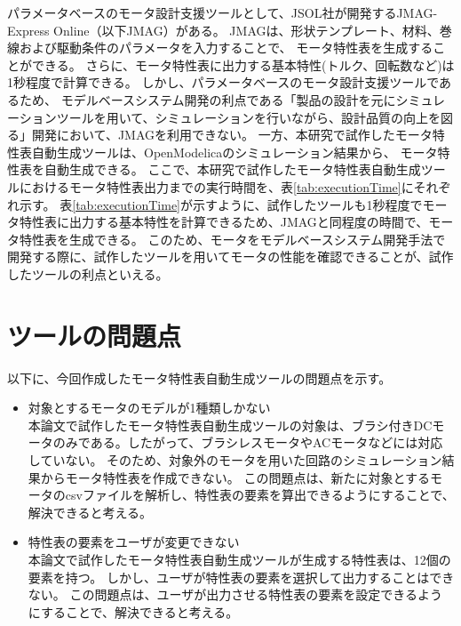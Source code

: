 パラメータベースのモータ設計支援ツールとして、JSOL社が開発するJMAG-Express Online（以下JMAG）がある\cite{jmag}。
JMAGは、形状テンプレート、材料、巻線および駆動条件のパラメータを入力することで、
モータ特性表を生成することができる。
さらに、モータ特性表に出力する基本特性(トルク、回転数など)は1秒程度で計算できる。
しかし、パラメータベースのモータ設計支援ツールであるため、
モデルベースシステム開発の利点である「製品の設計を元にシミュレーションツールを用いて、シミュレーションを行いながら、設計品質の向上を図る」開発において、JMAGを利用できない。
一方、本研究で試作したモータ特性表自動生成ツールは、OpenModelicaのシミュレーション結果から、
モータ特性表を自動生成できる。
ここで、本研究で試作したモータ特性表自動生成ツールにおけるモータ特性表出力までの実行時間を、表\ref{tab:executionTime}にそれぞれ示す。
表\ref{tab:executionTime}が示すように、試作したツールも1秒程度でモータ特性表に出力する基本特性を計算できるため、JMAGと同程度の時間で、モータ特性表を生成できる。
このため、モータをモデルベースシステム開発手法で開発する際に、試作したツールを用いてモータの性能を確認できることが、試作したツールの利点といえる。

\section{ツールの問題点}

以下に、今回作成したモータ特性表自動生成ツールの問題点を示す。

\begin{itemize}
	\item 対象とするモータのモデルが1種類しかない\\
      本論文で試作したモータ特性表自動生成ツールの対象は、ブラシ付きDCモータのみである。したがって、ブラシレスモータやACモータなどには対応していない。
      そのため、対象外のモータを用いた回路のシミュレーション結果からモータ特性表を作成できない。
		  この問題点は、新たに対象とするモータのcsvファイルを解析し、特性表の要素を算出できるようにすることで、解決できると考える。

  \item 特性表の要素をユーザが変更できない\\
        本論文で試作したモータ特性表自動生成ツールが生成する特性表は、12個の要素を持つ。
        しかし、ユーザが特性表の要素を選択して出力することはできない。
        この問題点は、ユーザが出力させる特性表の要素を設定できるようにすることで、解決できると考える。



\end{itemize}







